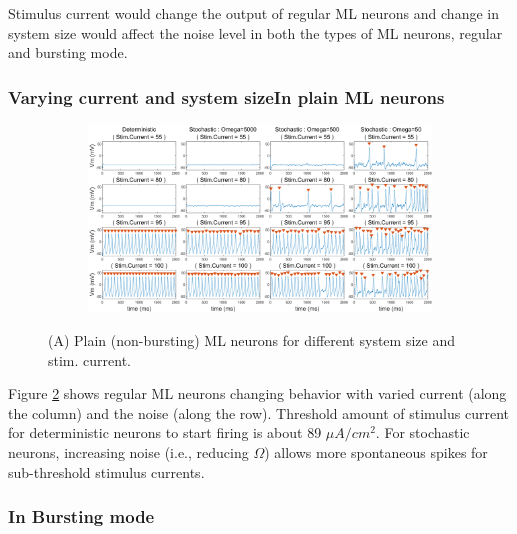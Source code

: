 \documentclass[
]{article}
\begin{document}
Stimulus current would change the output of regular ML neurons and change in system size would affect the noise level in both the types of ML neurons, regular and bursting mode.

\hypertarget{varying-current-and-system-sizein-plain-ml-neurons}{%
\subsubsection{Varying current and system sizeIn plain ML neurons}\label{varying-current-and-system-sizein-plain-ml-neurons}}

\begin{figure}
  \captionsetup[subfigure]{labelformat=empty} \centering
  \begin{subfigure}[b]{\textwidth}
    \includegraphics[width=\textwidth]{figs/F1_A_ML_Omega_Current.png}
    \caption{} \label{fig:fig1nb}
  \end{subfigure}
  \vspace{-1cm}
  \caption{(A) Plain (non-bursting) ML neurons for different system size and stim. current.}
\end{figure}

Figure \ref{fig:fig1nb} shows regular ML neurons changing behavior with varied current (along the column) and the noise (along the row). Threshold amount of stimulus current for deterministic neurons to start firing is about 89 \(\mu A/cm^2\). For stochastic neurons, increasing noise (i.e., reducing \(\Omega\)) allows more spontaneous spikes for sub-threshold stimulus currents.

\hypertarget{in-bursting-mode}{%
\subsubsection{In Bursting mode}\label{in-bursting-mode}}
\end{document}
